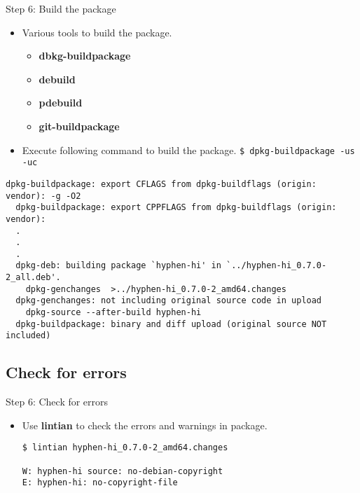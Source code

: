 \documentclass[red,10pt,a4paper]{beamer}
\begin{document}
\begin{frame}[fragile]{Step 6: Build the package}
\hbr
\begin{itemize}
 \item Various tools to build the package.
 \begin{itemize}
  \item \textbf{dbkg-buildpackage}
  \item \textbf{debuild}
  \item \textbf{pdebuild}
  \item \textbf{git-buildpackage}
 \end{itemize}
 
 \item Execute following command to build the package. \newline
 \lstinline|$ dpkg-buildpackage -us -uc|
\end{itemize}

 \begin{lstlisting}[basicstyle=\fontsize{7pt}{10}\ttfamily]
  dpkg-buildpackage: export CFLAGS from dpkg-buildflags (origin: vendor): -g -O2
  dpkg-buildpackage: export CPPFLAGS from dpkg-buildflags (origin: vendor): 
  .
  .
  .
  dpkg-deb: building package `hyphen-hi' in `../hyphen-hi_0.7.0-2_all.deb'.
    dpkg-genchanges  >../hyphen-hi_0.7.0-2_amd64.changes
  dpkg-genchanges: not including original source code in upload
    dpkg-source --after-build hyphen-hi
  dpkg-buildpackage: binary and diff upload (original source NOT included)

 \end{lstlisting}
 
\end{frame}

\subsection{Check for errors}

\begin{frame}[fragile]{Step 6: Check for errors}
 \hbr
 \begin{itemize}
  \item Use \textbf{lintian} to check the errors and warnings in package.
  \begin{lstlisting}[basicstyle=\fontsize{10pt}{10}\ttfamily]
$ lintian hyphen-hi_0.7.0-2_amd64.changes 

W: hyphen-hi source: no-debian-copyright
E: hyphen-hi: no-copyright-file
  \end{lstlisting}

 \end{itemize}

\end{frame}
\end{document}
